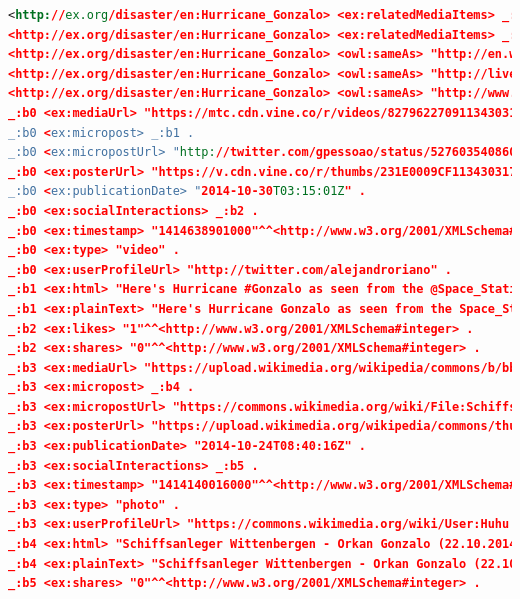 \documentclass[letterpaper]{article}
\begin{document}
\begin{lstlisting}[caption={Exemplary Linked Data for \emph{Hurricane Gonzalo using a~yet to-be-defined vocabulary}
  that interlinks the disaster with several other Linked Data sources and relates it to
  multimedia content on online social networking sites},
  label=listing:linkeddata,language=xml,float=*t, stringstyle=\color{gray}]
<http://ex.org/disaster/en:Hurricane_Gonzalo> <ex:relatedMediaItems> _:b0 .
<http://ex.org/disaster/en:Hurricane_Gonzalo> <ex:relatedMediaItems> _:b3 .
<http://ex.org/disaster/en:Hurricane_Gonzalo> <owl:sameAs> "http://en.wikipedia.org/wiki/Hurricane_Gonzalo" .
<http://ex.org/disaster/en:Hurricane_Gonzalo> <owl:sameAs> "http://live.dbpedia.org/page/Hurricane_Gonzalo" .
<http://ex.org/disaster/en:Hurricane_Gonzalo> <owl:sameAs> "http://www.freebase.com/m/0123kcg5" .
_:b0 <ex:mediaUrl> "https://mtc.cdn.vine.co/r/videos/82796227091134303173323251712_2ca88ba5444.5.1.16698738182474199804.mp4?versionId=lQg_XfKqV0RaIuCj.NbGcrF_ZgJXyh_c" .
_:b0 <ex:micropost> _:b1 .
_:b0 <ex:micropostUrl> "http://twitter.com/gpessoao/status/527603540860997632" .
_:b0 <ex:posterUrl> "https://v.cdn.vine.co/r/thumbs/231E0009CF1134303174572797952_2.5.1.16698738182474199804.mp4.jpg?versionId=BqFb7QzroSRabWyfVz0bniPods.rece_" .
_:b0 <ex:publicationDate> "2014-10-30T03:15:01Z" .
_:b0 <ex:socialInteractions> _:b2 .
_:b0 <ex:timestamp> "1414638901000"^^<http://www.w3.org/2001/XMLSchema#integer> .
_:b0 <ex:type> "video" .
_:b0 <ex:userProfileUrl> "http://twitter.com/alejandroriano" .
_:b1 <ex:html> "Here's Hurricane #Gonzalo as seen from the @Space_Station as it orbited above today https://t.co/RpJt0P2bXa" .
_:b1 <ex:plainText> "Here's Hurricane Gonzalo as seen from the Space_Station as it orbited above today" .
_:b2 <ex:likes> "1"^^<http://www.w3.org/2001/XMLSchema#integer> .
_:b2 <ex:shares> "0"^^<http://www.w3.org/2001/XMLSchema#integer> .
_:b3 <ex:mediaUrl> "https://upload.wikimedia.org/wikipedia/commons/b/bb/Schiffsanleger_Wittenbergen_-_Orkan_Gonzalo_%2822.10.2014%29_01.jpg" .
_:b3 <ex:micropost> _:b4 .
_:b3 <ex:micropostUrl> "https://commons.wikimedia.org/wiki/File:Schiffsanleger_Wittenbergen_-_Orkan_Gonzalo_(22.10.2014)_01.jpg" .
_:b3 <ex:posterUrl> "https://upload.wikimedia.org/wikipedia/commons/thumb/b/bb/Schiffsanleger_Wittenbergen_-_Orkan_Gonzalo_%2822.10.2014%29_01.jpg/500px-Schiffsanleger_Wittenbergen_-_Orkan_Gonzalo_(22.10.2014)_01.jpg" .
_:b3 <ex:publicationDate> "2014-10-24T08:40:16Z" .
_:b3 <ex:socialInteractions> _:b5 .
_:b3 <ex:timestamp> "1414140016000"^^<http://www.w3.org/2001/XMLSchema#integer> .
_:b3 <ex:type> "photo" .
_:b3 <ex:userProfileUrl> "https://commons.wikimedia.org/wiki/User:Huhu Uet" .
_:b4 <ex:html> "Schiffsanleger Wittenbergen - Orkan Gonzalo (22.10.2014) 01" .
_:b4 <ex:plainText> "Schiffsanleger Wittenbergen - Orkan Gonzalo (22.10.2014) 01" .
_:b5 <ex:shares> "0"^^<http://www.w3.org/2001/XMLSchema#integer> .
\end{lstlisting}
\end{document}
